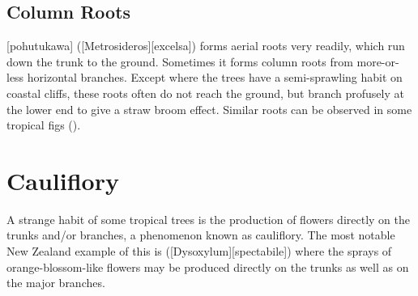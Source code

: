 \subsection{Column Roots}

[pohutukawa] ([Metrosideros][excelsa]) forms aerial roots very readily, which run down the trunk to the ground.
Sometimes it forms column roots from more-or-less horizontal branches.
Except where the trees have a semi-sprawling habit on coastal cliffs, these roots often do not reach the ground, but branch profusely at the lower end to give a straw broom effect.
Similar roots can be observed in some tropical figs ().

\section{Cauliflory}

A strange habit of some tropical trees is the production of flowers directly on the trunks and/or branches, a phenomenon known as cauliflory.
The most notable New Zealand example of this is  ([Dysoxylum][spectabile]) where the sprays of orange-blossom-like flowers may be produced directly on the trunks as well as on the major branches.

